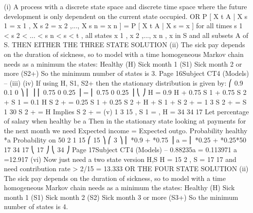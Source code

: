 \documentclass[a4paper,12pt]{article}
\begin{document}
\begin{enumerate}
(i)
A process with a discrete state space and discrete time space
where the future development is only dependent on the current state occupied.
OR
P [ X t \in A | X s 1 = x 1 , X s 2 = x 2 ,..., X s n = x n ] = P [ X t \in A | X s = x ]
for all times s 1 < s 2 < ... < s n < s < t , all states x 1 , x 2 ,..., x n , x in S and all
subsets A of S.
THEN EITHER THE THREE STATE SOLUTION
(ii)
The sick pay depends on the duration of sickness, so to model with a time
homogeneous Markov chain needs as a minimum the states:
Healthy (H)
Sick month 1 (S1)
Sick month 2 or more (S2+)
So the minimum number of states is 3.
Page 16Subject CT4 (Models) – %
(iii)
(iv)
If using H, S1, S2+ then the stationary distribution \pi is given by:
⎛ 0.9 0.1 0 ⎞
⎜
⎟
\pi ⎜ 0.75 0 0.25 ⎟ = \pi
⎜ 0.75 0 0.25 ⎟
⎝
⎠
\pi H = 0.9 \pi H + 0.75 \pi S 1 + 0.75 \pi S 2 +
\pi S 1 = 0.1 \pi H
\pi S 2 + = 0.25 \pi S 1 + 0.25 \pi S 2 +
\pi H + \pi S 1 + \pi S 2 + = 1
3 \pi S 2 + = \pi S 1
30 \pi S 2 + = \pi H
Implies
\pi S 2 + =
(v)
1
3
15
, \pi S 1 = , \pi H =
34
34
17
Let percentage of salary when healthy be a%
Then in the stationary state looking at payments for the next month we need
Expected income = Expected outgo.
Probability healthy *a%
Probability on 50%
2
1
15
⎛ 15
⎞
⎛ 3
⎞
⎜ *0.9 + *0.75 ⎟ a = ⎜ *0.25 + *0.25*50%
17
34
17
⎝ 17
⎠
⎝ 34
⎠
Page 17Subject CT4 (Models) – %
0.88235a = 0.113971
a =12.917%
(vi)
Now just need a two state version {H,S}
\pi H =
15
2
, \pi S =
17
17
and need contribution rate > 2/15 = 13.333%
OR THE FOUR STATE SOLUTION
(ii)
The sick pay depends on the duration of sickness, so to model with a time
homogeneous Markov chain needs as a minimum the states:
Healthy (H)
Sick month 1 (S1)
Sick month 2 (S2)
Sick month 3 or more (S3+)
So the minimum number of states is 4.


\end{enumerate}
\end{document}
